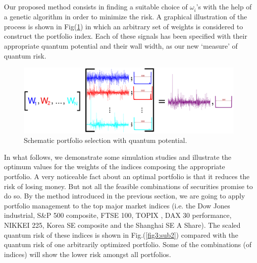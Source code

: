 \documentclass[journal,article,submit,moreauthors,pdftex]{Definitions/mdpi}
\begin{document}
Our proposed method consists in finding a suitable choice of $\omega
_{i}^{{}}$'s with the help of a genetic algorithm in order to minimize the
risk. A graphical illustration of the process is shown in Fig(\ref{fig:2})
in which an arbitrary set of weights is considered to construct the
portfolio index. Each of these signals has been specified with their
appropriate quantum potential and their wall width, as our new `measure' of
quantum risk.\newline
\begin{figure}[tbh]
	\centering
	\includegraphics[width=120mm]{new1_fig0.png}
	\caption{Schematic portfolio selection with quantum potential.}
	\label{fig:2}
\end{figure}
\newpage In what follows, we demonstrate some simulation studies and
illustrate the optimum values for the weights of the indices composing the
appropriate portfolio. A very noticeable fact about an optimal portfolio is
that it reduces the risk of losing money. But not all the feasible
combinations of securities promise to do so. By the method introduced in the
previous section, we are going to apply portfolio management to the top
major market indices (i.e. the Dow Jones industrial, S\&P 500 composite,
FTSE 100, TOPIX , DAX 30 performance, NIKKEI 225, Korea SE composite and the
Shanghai SE A Share). The scaled quantum risk of these indices is shown in
Fig.(\ref{fig3:sub2}) compared with the quantum risk of one arbitrarily
optimized portfolio. Some of the combinations (of indices) will show the
lower risk amongst all portfolios.
\end{document}
